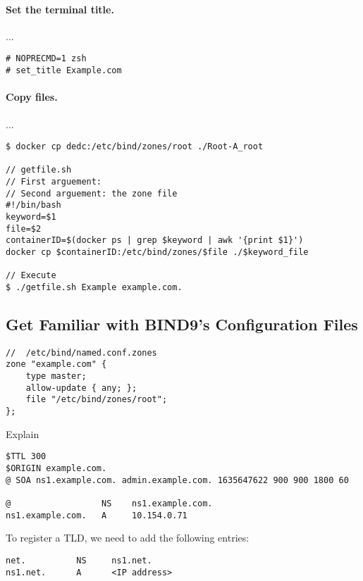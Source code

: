 \paragraph{Set the terminal title.} ...

\begin{lstlisting}
# NOPRECMD=1 zsh
# set_title Example.com
\end{lstlisting}
 

\paragraph{Copy files.} ... 

\begin{lstlisting}
$ docker cp dedc:/etc/bind/zones/root ./Root-A_root

// getfile.sh
// First arguement: 
// Second arguement: the zone file
#!/bin/bash
keyword=$1
file=$2
containerID=$(docker ps | grep $keyword | awk '{print $1}')
docker cp $containerID:/etc/bind/zones/$file ./$keyword_file

// Execute 
$ ./getfile.sh Example example.com.
\end{lstlisting}
 




\subsection{Get Familiar with BIND9's Configuration Files}


\begin{lstlisting}
//  /etc/bind/named.conf.zones
zone "example.com" { 
    type master; 
    allow-update { any; }; 
    file "/etc/bind/zones/root"; 
};
\end{lstlisting}
 
Explain 

\begin{lstlisting}
$TTL 300
$ORIGIN example.com.
@ SOA ns1.example.com. admin.example.com. 1635647622 900 900 1800 60

@                  NS    ns1.example.com.
ns1.example.com.   A     10.154.0.71
\end{lstlisting}


To register a TLD, we need to add the following entries:

\begin{lstlisting}
net.          NS     ns1.net.
ns1.net.      A      <IP address> 
\end{lstlisting}
 
